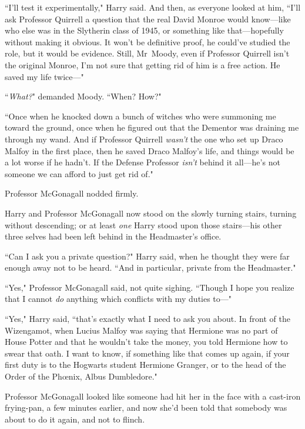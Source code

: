 ``I'll test it experimentally," Harry said. And then, as everyone looked at him, ``I'll ask Professor Quirrell a question that the real David Monroe would know—like who else was in the Slytherin class of 1945, or something like that—hopefully without making it obvious. It won't be definitive proof, he could've studied the role, but it would be evidence. Still, Mr~Moody, even if Professor Quirrell isn't the original Monroe, I'm not sure that getting rid of him is a free action. He saved my life twice—"

``\emph{What?}" demanded Moody. ``When? How?"

``Once when he knocked down a bunch of witches who were summoning me toward the ground, once when he figured out that the Dementor was draining me through my wand. And if Professor Quirrell \emph{wasn't} the one who set up Draco Malfoy in the first place, then he saved Draco Malfoy's life, and things would be a lot worse if he hadn't. If the Defense Professor \emph{isn't} behind it all—he's not someone we can afford to just get rid of."

Professor McGonagall nodded firmly.


Harry and Professor McGonagall now stood on the slowly turning stairs, turning without descending; or at least \emph{one} Harry stood upon those stairs—his other three selves had been left behind in the Headmaster's office.

``Can I ask you a private question?" Harry said, when he thought they were far enough away not to be heard. ``And in particular, private from the Headmaster."

``Yes," Professor McGonagall said, not quite sighing. ``Though I hope you realize that I cannot \emph{do} anything which conflicts with my duties to—"

``Yes," Harry said, ``that's exactly what I need to ask you about. In front of the Wizengamot, when Lucius Malfoy was saying that Hermione was no part of House Potter and that he wouldn't take the money, you told Hermione how to swear that oath. I want to know, if something like that comes up again, if your first duty is to the Hogwarts student Hermione Granger, or to the head of the Order of the Phœnix, Albus Dumbledore."

Professor McGonagall looked like someone had hit her in the face with a cast-iron frying-pan, a few minutes earlier, and now she'd been told that somebody was about to do it again, and not to flinch.

